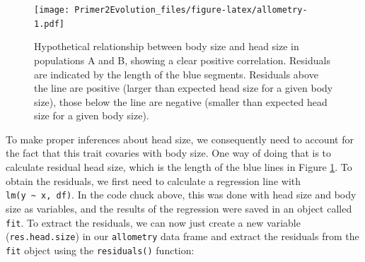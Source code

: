 \documentclass[
]{book}
\newenvironment{Shaded}{\begin{snugshade}}{\end{snugshade}}
\newcommand{\AttributeTok}[1]{\textcolor[rgb]{0.77,0.63,0.00}{#1}}
\newcommand{\CommentTok}[1]{\textcolor[rgb]{0.56,0.35,0.01}{\textit{#1}}}
\newcommand{\ConstantTok}[1]{\textcolor[rgb]{0.00,0.00,0.00}{#1}}
\newcommand{\FunctionTok}[1]{\textcolor[rgb]{0.00,0.00,0.00}{#1}}
\newcommand{\NormalTok}[1]{#1}
\newcommand{\OtherTok}[1]{\textcolor[rgb]{0.56,0.35,0.01}{#1}}
\newcommand{\SpecialCharTok}[1]{\textcolor[rgb]{0.00,0.00,0.00}{#1}}
\newcommand{\StringTok}[1]{\textcolor[rgb]{0.31,0.60,0.02}{#1}}
\begin{document}
\begin{Shaded}
\end{Shaded}

\begin{figure}
\centering
\texttt{[image: Primer2Evolution\_files/figure-latex/allometry-1.pdf]}
\caption{\label{fig:allometry}Hypothetical relationship between body size and head size in populations A and B, showing a clear positive correlation. Residuals are indicated by the length of the blue segments. Residuals above the line are positive (larger than expected head size for a given body size), those below the line are negative (smaller than expected head size for a given body size).}
\end{figure}

To make proper inferences about head size, we consequently need to account for the fact that this trait covaries with body size. One way of doing that is to calculate residual head size, which is the length of the blue lines in Figure \ref{fig:allometry}. To obtain the residuals, we first need to calculate a regression line with \texttt{lm(y\ \textasciitilde{}\ x,\ df)}. In the code chuck above, this was done with head size and body size as variables, and the results of the regression were saved in an object called \texttt{fit}. To extract the residuals, we can now just create a new variable (\texttt{res.head.size}) in our \texttt{allometry} data frame and extract the residuals from the \texttt{fit} object using the \texttt{residuals()} function:
\end{document}
